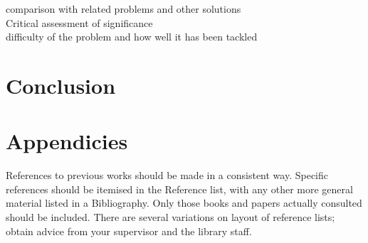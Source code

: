 \documentclass[a4paper]{article}
\begin{document}
comparison with related problems and other solutions\\

Critical assessment of significance\\

difficulty of the problem and how well it has been tackled\\

\cite{liuLiquidMetalMachine2016}

\newpage

\section{Conclusion}

\newpage

\section{Appendicies}

\newpage
References to previous works should be made in a consistent way. Specific references should be itemised in the Reference list, with any other more general material listed in a Bibliography. Only those books and papers actually consulted should be included. There are several variations on layout of reference lists; obtain advice from your supervisor and the library staff.  

\printbibliography
	
\end{document}
